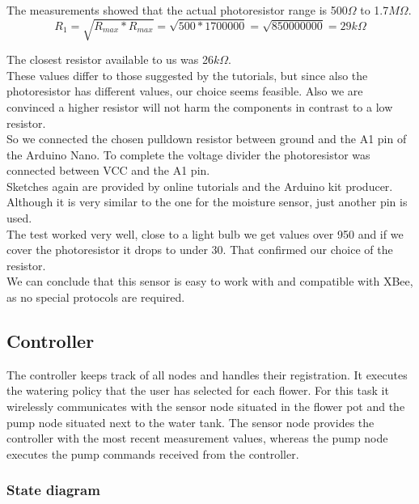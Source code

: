 \documentclass[12pt,a4paper,titlepage,oneside]{article}
\begin{document}
\begin{itemize}
The measurements showed that the actual photoresistor range is 500$\Omega$ to 1.7$M\Omega$.\\
\begin{equation}
R_1 = \sqrt{R_{max}*R_{max}} = \sqrt{500*1700000} = \sqrt{850000000} = 29k\Omega
\end{equation}


The closest resistor available to us was 26$k\Omega$.\\
These values differ to those suggested by the tutorials, but since also the photoresistor has different values, our choice seems feasible. Also we are convinced a higher resistor will not harm the components in contrast to a low resistor.\\
So we connected the chosen pulldown resistor between ground and the A1 pin of the Arduino Nano. To complete the voltage divider the photoresistor was connected between VCC and the A1 pin.\\

Sketches again are provided by online tutorials and the Arduino kit producer. Although it is very similar to the one for the moisture sensor, just another pin is used.\\

The test worked very well, close to a light bulb we get values over 950 and if we cover the photoresistor it drops to under 30. That confirmed our choice of the resistor.\\

We can conclude that this sensor is easy to work with and compatible with XBee, as no special protocols are required.

\end{itemize}



\subsection{Controller}
The controller keeps track of all nodes and handles their registration.
It executes the watering policy that the user has selected for each flower.
For this task it wirelessly communicates with the sensor node situated in the flower pot and the pump node situated next to the water tank. The sensor node provides the controller with the most recent measurement values, whereas the pump node executes the pump commands received from the controller.

\subsubsection{State diagram}
\end{document}
